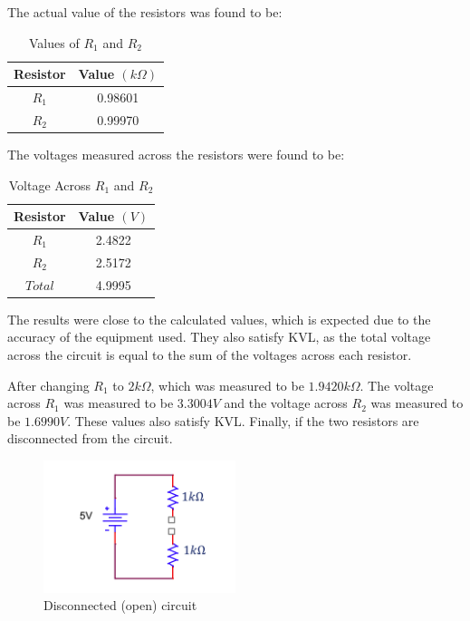 \documentclass{article}
\begin{document}
The actual value of the resistors was found to be:
\begin{table}[H]
    \centering
    \begin{tabular}{|c|c|}
        \hline
        Resistor & Value $(k\Omega)$ \\
        \hline
        $R_1$ & 0.98601 \\
        \hline
        $R_2$ & 0.99970 \\
        \hline
    \end{tabular}
    \caption{Values of $R_1$ and $R_2$}
    \label{tab:2.4resistor_values}
\end{table}
 The voltages measured across the resistors were found to be:
\begin{table}[H]
    \centering
    \begin{tabular}{|c|c|}
        \hline
        Resistor & Value $(V)$ \\
        \hline
        $R_1$ & 2.4822 \\
        \hline
        $R_2$ & 2.5172 \\
        \hline
        $Total$ & 4.9995 \\
        \hline
    \end{tabular}
    \caption{Voltage Across $R_1$ and $R_2$}
    \label{tab:2.5resistor_voltages}
\end{table}

The results were close to the calculated values, which is expected due 
to the accuracy of the equipment used. They also satisfy KVL, as the total 
voltage across the circuit is equal to the sum of the voltages across each resistor.
\newline

After changing $R_1$ to $2k\Omega$, which was measured to be $1.9420 k\Omega$. The voltage across
$R_1$ was measured to be $3.3004V$ and the voltage across $R_2$ was measured to be $1.6990V$. 
These values also satisfy KVL. Finally, if the two resistors are disconnected from the circuit.

\begin{figure}[H]
	\centering
	\includegraphics[width=0.5\textwidth]{disconnected_(open)_circuit.png}
	\caption{Disconnected (open) circuit}
	\label{fig:fig7}
\end{figure}
\end{document}
